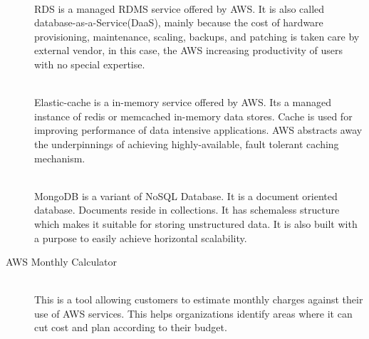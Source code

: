 \begin{description}
  \item[{Relational Database Service (RDS)] \hfill \\
      RDS is a managed RDMS service offered by AWS. It is also called database-as-a-Service(DaaS), mainly
      because the cost of hardware provisioning, maintenance, scaling, backups, and patching is taken
      care by external vendor, in this case, the AWS increasing productivity of users with no special
      expertise.

  \item[{Elastic Cache] \hfill \\
      Elastic-cache is a in-memory service offered by AWS. Its a managed instance of redis or memcached
      in-memory data stores. Cache is used for improving performance of data intensive applications.
      AWS abstracts away the underpinnings of achieving highly-available, fault tolerant caching mechanism.


  \item[{MongoDB] \hfill \\
      MongoDB is a variant of NoSQL Database. It is a document oriented database. Documents reside in
      collections. It has schemaless structure which makes it suitable for storing unstructured data.
      It is also built with a purpose to easily achieve horizontal scalability.

  \item[AWS Monthly Calculator] \hfill \\
      This is a tool allowing customers to estimate monthly charges against their use of AWS services.
      This helps organizations identify areas where it can cut cost and plan according to their budget.
\end{description}


\pagebreak

